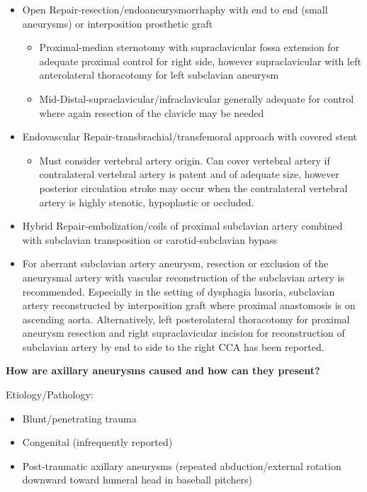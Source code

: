 \documentclass[
]{book}
\providecommand{\tightlist}{%
  \setlength{\itemsep}{0pt}\setlength{\parskip}{0pt}}
\begin{document}
\begin{itemize}
\item
  Open Repair-resection/endoaneurysmorrhaphy with end to end (small
  aneurysms) or interposition prosthetic graft~

  \begin{itemize}
  \item
    Proximal-median sternotomy with supraclavicular fossa extension
    for adequate proximal control for right side, however
    supraclavicular with left anterolateral thoracotomy for left
    subclavian aneurysm~
  \item
    Mid-Distal-supraclavicular/infraclavicular generally adequate
    for control where again resection of the clavicle may be needed~
  \end{itemize}
\item
  Endovascular Repair-transbrachial/transfemoral approach with covered
  stent~

  \begin{itemize}
  \tightlist
  \item
    Must consider vertebral artery origin. Can cover vertebral
    artery if contralateral vertebral artery is patent and of
    adequate size, however posterior circulation stroke may occur
    when the contralateral vertebral artery is highly stenotic,
    hypoplastic or occluded.
  \end{itemize}
\item
  Hybrid Repair-embolization/coils of proximal subclavian artery
  combined with subclavian transposition or carotid-subclavian bypass
\item
  For aberrant subclavian artery aneurysm, resection or exclusion of
  the aneurysmal artery with vascular reconstruction of the subclavian
  artery is recommended. Especially in the setting of dysphagia
  lusoria, subclavian artery reconstructed by interposition graft
  where proximal anastomosis is on ascending aorta. Alternatively,
  left posterolateral thoracotomy for proximal aneurysm resection and
  right supraclavicular incision for reconstruction of subclavian
  artery by end to side to the right CCA has been reported.
\end{itemize}

\textbf{How are axillary aneurysms caused and how can they present?}

Etiology/Pathology:~

\begin{itemize}
\item
  Blunt/penetrating trauma
\item
  Congenital (infrequently reported)
\item
  Post-traumatic axillary aneurysms (repeated abduction/external
  rotation downward toward humeral head in baseball pitchers)~
\end{itemize}
\end{document}
